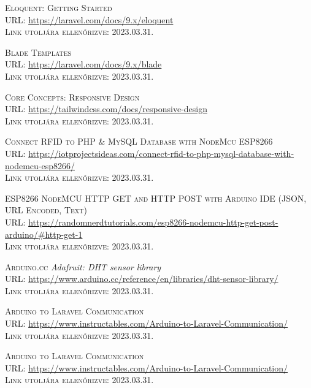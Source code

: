 \documentclass[
]{thesis-ekf}
\theoremstyle{definition}
\theoremstyle{remark}
\begin{document}
\begin{thebibliography}{20}
		\textsc{Eloquent: Getting Started}\\
		\textsc{URL:} \url{https://laravel.com/docs/9.x/eloquent}\\
		\textsc{Link utoljára ellenőrizve:} 2023.03.31.
		
		\textsc{Blade Templates}\\
		\textsc{URL:} \url{https://laravel.com/docs/9.x/blade}\\
		\textsc{Link utoljára ellenőrizve:} 2023.03.31.
		
		\textsc{Core Concepts: Responsive Design}\\
		\textsc{URL:} \url{https://tailwindcss.com/docs/responsive-design}\\
		\textsc{Link utoljára ellenőrizve:} 2023.03.31.
		
		\textsc{Connect RFID to PHP \& MySQL Database with NodeMcu ESP8266}\\
		\textsc{URL:} \url{https://iotprojectsideas.com/connect-rfid-to-php-mysql-database-with-nodemcu-esp8266/}\\
		\textsc{Link utoljára ellenőrizve:} 2023.03.31.
		
		\textsc{ESP8266 NodeMCU HTTP GET and HTTP POST with Arduino IDE (JSON, URL Encoded, Text)}\\
		\textsc{URL:} \url{https://randomnerdtutorials.com/esp8266-nodemcu-http-get-post-arduino/#http-get-1}\\
		\textsc{Link utoljára ellenőrizve:} 2023.03.31.
		
		
		\textsc{Arduino.cc} \emph{Adafruit: DHT sensor library}\\
		\textsc{URL:} \url{https://www.arduino.cc/reference/en/libraries/dht-sensor-library/}\\
		\textsc{Link utoljára ellenőrizve:} 2023.03.31.
		
		\textsc{Arduino to Laravel Communication}\\
		\textsc{URL:} \url{https://www.instructables.com/Arduino-to-Laravel-Communication/}\\
		\textsc{Link utoljára ellenőrizve:} 2023.03.31.
		
		\textsc{Arduino to Laravel Communication}\\
		\textsc{URL:} \url{https://www.instructables.com/Arduino-to-Laravel-Communication/}\\
		\textsc{Link utoljára ellenőrizve:} 2023.03.31.
		

\end{thebibliography}
\end{document}
